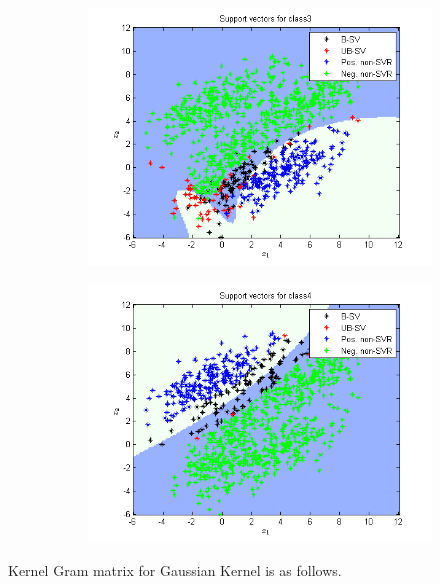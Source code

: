 \documentclass{article}
\begin{document}
\begin{figure}
\begin{subfigure}{.5\textwidth}
  \centering
  \includegraphics[width=.8\linewidth]{Classification/1c/nu_g/sv3}
 
\end{subfigure}%
\begin{subfigure}{.5\textwidth}
  \centering
  \includegraphics[width=.8\linewidth]{Classification/1c/nu_g/sv4}
  
\end{subfigure}
\end{figure}
\newpage
Kernel Gram matrix for Gaussian Kernel is as follows.
\end{document}
